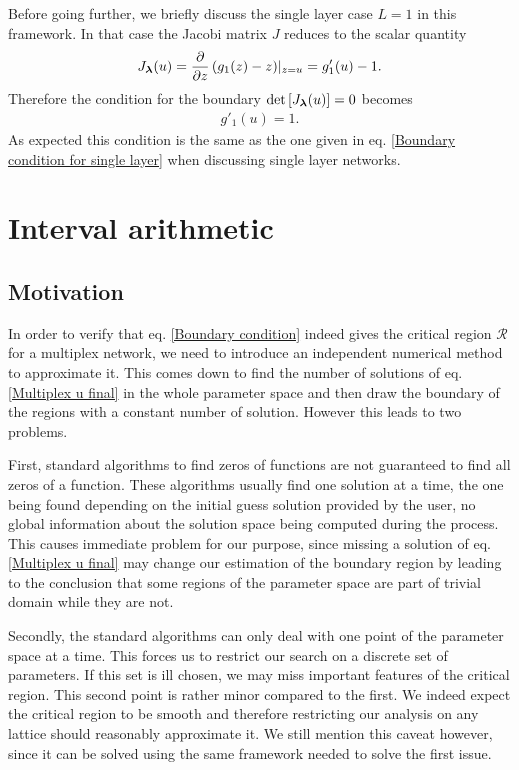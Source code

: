 \documentclass[
11pt, %
english, %
singlespacing, %
nolistspacing, %
liststotoc, %
headsepline, %
]{MastersDoctoralThesis} %
\begin{document}
Before going further, we briefly discuss the single layer case $L = 1$ in this framework. In that case the Jacobi matrix $J$ reduces to the scalar quantity
\begin{align}
	J_{\boldsymbol{\mathrm{\lambda}}}(u) = \frac{\partial}{\partial z} \left(g_1(z) - z\right)\rvert_{z = u} = g'_1(u) - 1.
\end{align}
Therefore the condition for the boundary $\det \left[ J_{\boldsymbol{\mathrm{\lambda}}}(u)\right] = 0$ becomes
\begin{align}
	g'_1(u) = 1.
\end{align}
As expected this condition is the same as the one given in eq. \eqref{Boundary condition for single layer} when discussing single layer networks.

\section{Interval arithmetic}
\label{Section: Interval arithemetic}

\subsection{Motivation}

In order to verify that eq. \eqref{Boundary condition} indeed gives the critical region $\mathcal{R}$ for a multiplex network, we need to introduce an independent numerical method to approximate it. This comes down to find the number of solutions of eq. \eqref{Multiplex u final} in the whole parameter space and then draw the boundary of the regions with a constant number of solution. However this leads to two problems.

First, standard algorithms to find zeros of functions are not guaranteed to find all zeros of a function. These algorithms usually find one solution at a time, the one being found depending on the initial guess solution provided by the user, no global information about the solution space being computed during the process. This causes immediate problem for our purpose, since missing a solution of eq. \eqref{Multiplex u final} may change our estimation of the boundary region by leading to the conclusion that some regions of the parameter space are part of trivial domain while they are not.

Secondly, the standard algorithms can only deal with one point of the parameter space at a time. This forces us to restrict our search on a discrete set of parameters. If this set is ill chosen, we may miss important features of the critical region. This second point is rather minor compared to the first. We indeed expect the critical region to be smooth and therefore restricting our analysis on any lattice should reasonably approximate it. We still mention this caveat however, since it can be solved using the same framework needed to solve the first issue.
\end{document}
